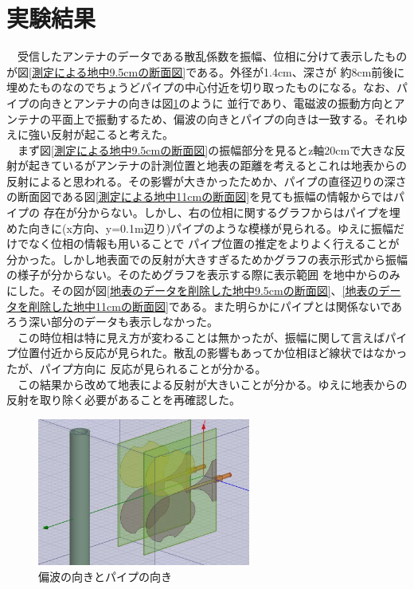 \documentclass[12pt,a4paper]{jsreport}
\begin{document}
\section{実験結果}
　受信したアンテナのデータである散乱係数を振幅、位相に分けて表示したものが図\ref{測定による地中9.5cmの断面図}である。外径が1.4cm、深さが
約8cm前後に埋めたものなのでちょうどパイプの中心付近を切り取ったものになる。なお、パイプの向きとアンテナの向きは図\ref{偏波の向きとパイプの向き}のように
並行であり、電磁波の振動方向とアンテナの平面上で振動するため、偏波の向きとパイプの向きは一致する。それゆえに強い反射が起こると考えた。
\\　まず図\ref{測定による地中9.5cmの断面図}の振幅部分を見るとz軸20cmで大きな反射が起きているがアンテナの計測位置と地表の距離を考えるとこれは地表からの
反射によると思われる。その影響が大きかったためか、パイプの直径辺りの深さの断面図である図\ref{測定による地中11cmの断面図}を見ても振幅の情報からではパイプの
存在が分からない。しかし、右の位相に関するグラフからはパイプを埋めた向きに(x方向、y=0.1m辺り)パイプのような模様が見られる。ゆえに振幅だけでなく位相の情報も用いることで
パイプ位置の推定をよりよく行えることが分かった。しかし地表面での反射が大きすぎるためかグラフの表示形式から振幅の様子が分からない。そのためグラフを表示する際に表示範囲
を地中からのみにした。その図が図\ref{地表のデータを削除した地中9.5cmの断面図}、\ref{地表のデータを削除した地中11cmの断面図}である。また明らかにパイプとは関係ないであろう深い部分のデータも表示しなかった。
\\　この時位相は特に見え方が変わることは無かったが、振幅に関して言えばパイプ位置付近から反応が見られた。散乱の影響もあってか位相ほど線状ではなかったが、パイプ方向に
反応が見られることが分かる。
\\　この結果から改めて地表による反射が大きいことが分かる。ゆえに地表からの反射を取り除く必要があることを再確認した。

 \begin{figure}[h]
  \begin{center}
   \includegraphics[width=7cm]{./image/antennaimage.png}
  \caption{偏波の向きとパイプの向き}\label{偏波の向きとパイプの向き}
  \end{center}
  \end{figure}
\end{document}
